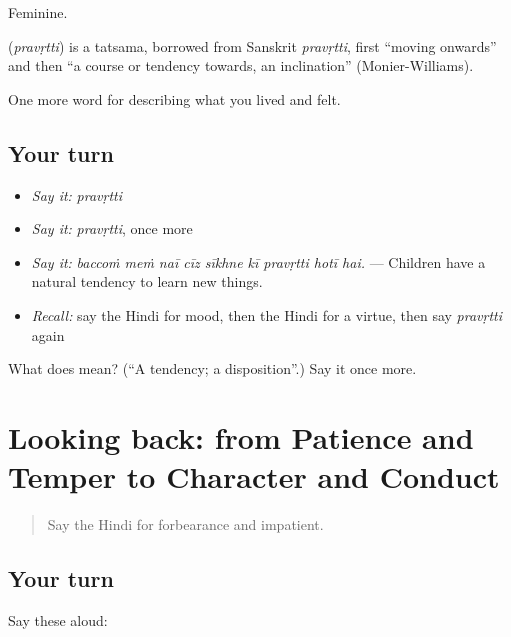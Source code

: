 Feminine.

\begin{cousinweb}
\textbf{} (\emph{pravṛtti}) is a tatsama, borrowed from Sanskrit \emph{pravṛtti}, first \textquotedblleft{}moving onwards\textquotedblright{} and then \textquotedblleft{}a course or tendency towards, an inclination\textquotedblright{} (Monier-Williams).
\end{cousinweb}

\begin{grammarlens}[title={What you've built}]
One more word for describing what you lived and felt.
\end{grammarlens}

\subsection*{Your turn}
\begin{itemize}
\raggedright
  \item \emph{Say it:} \emph{pravṛtti}
  \item \emph{Say it:} \emph{pravṛtti}, once more
  \item \emph{Say it:} \emph{baccoṁ meṁ naī cīz sīkhne kī pravṛtti hotī hai.} — Children have a natural tendency to learn new things.
  \item \emph{Recall:} say the Hindi for mood, then the Hindi for a virtue, then say \emph{pravṛtti} again
\end{itemize}

\begin{tcolorbox}[breakable,colback=teal!4,colframe=teal!35!black,title={Before you move on}]
What does  mean? (\textquotedblleft{}A tendency; a disposition\textquotedblright{}.) Say it once more.
\end{tcolorbox}
\section[(dialogue)]{Looking back: from Patience and Temper to Character and Conduct}

\label{lesson:HI-R475-review-468-475}



\begin{quote}
Say the Hindi for forbearance and impatient.
\end{quote}

\subsection*{Your turn}
Say these aloud:

